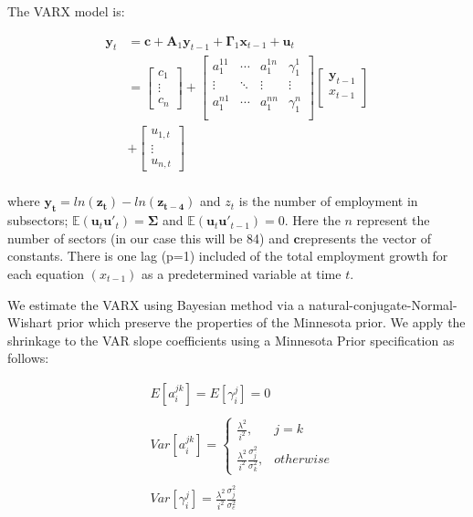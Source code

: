 \documentclass{monashthesis}
\begin{document}
The VARX model is:

\[
\begin{aligned}
\bm{y}_t&=\bm{c}+\bm{A}_1 \bm{y}_{t-1}+\bm{\Gamma}_1\bm{x}_{t-1}+\bm{u}_t\\
&=
\begin{bmatrix}
c_1\\
\vdots\\
c_n
\end{bmatrix}
+
\begin{bmatrix}
a_1^{11}&\cdots&a_1^{1n}&\gamma_1^{1}\\
\vdots&\ddots&\vdots&\vdots\\
a_1^{n1}&\cdots&a_1^{nn}&\gamma_1^n\\
\end{bmatrix}
\begin{bmatrix}
\bm{y}_{t-1}\\
x_{t-1}\\
\end{bmatrix}\\
&+
\begin{bmatrix}
u_{1,t}\\
\vdots\\
u_{n,t}
\end{bmatrix}\\
\end{aligned}
\]

where \(\bm{y_t} = ln(\bm{z_t})-ln(\bm{z_{t-4}})\) and \(z_t\) is the number of employment in subsectors; \(\mathbb{E}(\bm{u}_t\bm{u}'_t)=\bm{\Sigma}\) and \(\mathbb{E}(\bm{u}_t\bm{u'}_{t-1})=0\). Here the \(n\) represent the number of sectors (in our case this will be 84) and \(\bm{c}\)represents the vector of constants. There is one lag (p=1) included of the total employment growth for each equation \((x_{t-1})\) as a predetermined variable at time \(t\).

We estimate the VARX using Bayesian method via a natural-conjugate-Normal-Wishart prior which preserve the properties of the Minnesota prior. We apply the shrinkage to the VAR slope coefficients using a Minnesota Prior specification as follows:

\[
\begin{aligned}
&E[a_{i}^{jk}] = E[\gamma_{i}^j]=0\\
\\
&Var[a_i^{jk}]= 
\begin{cases}
\frac{\lambda^2}{i^2},&j=k\\
\frac{\lambda^2}{i^2}\frac{\sigma^2_{j}}{\sigma^2_k},& otherwise
\end{cases}\\
\\
&Var[\gamma_i^{j}]=\frac{\lambda^2}{i^2}\frac{\sigma^2_{j}}{\sigma^2_e}
\end{aligned}
\]
\end{document}
